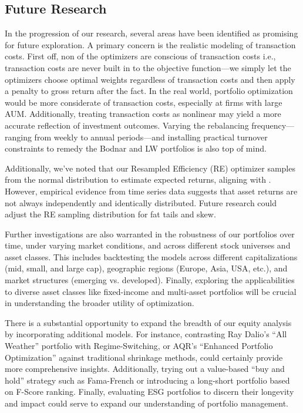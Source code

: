\documentclass[12pt,letterpaper]{article}
\begin{document}
\subsection{Future Research}
In the progression of our research, several areas have been identified as promising for future exploration. A primary concern is the realistic modeling of transaction costs. First off, non of the optimizers are conscious of transaction costs i.e., transaction costs are never built in to the objective function---we simply let the optimizers choose optimal weights regardless of transaction costs and then apply a penalty to gross return after the fact. In the real world, portfolio optimization would be more considerate of transaction costs, especially at firms with large AUM. Additionally, treating transaction costs as nonlinear may yield a more accurate reflection of investment outcomes. Varying the rebalancing frequency---ranging from weekly to annual periods---and installing practical turnover constraints to remedy the Bodnar and LW portfolios is also top of mind.

Additionally, we've noted that our Resampled Efficiency (RE) optimizer samples from the normal distribution to estimate expected returns, aligning with . However, empirical evidence from time series data suggests that asset returns are not always independently and identically distributed. Future research could adjust the RE sampling distribution for fat tails and skew.

Further investigations are also warranted in the robustness of our portfolios over time, under varying market conditions, and across different stock universes and asset classes. This includes backtesting the models across different capitalizations (mid, small, and large cap), geographic regions (Europe, Asia, USA, etc.), and market structures (emerging vs. developed). Finally, exploring the applicabilities to diverse asset classes like fixed-income and multi-asset portfolios will be crucial in understanding the broader utility of optimization.

There is a substantial opportunity to expand the breadth of our equity analysis by incorporating additional models. For instance, contrasting Ray Dalio's “All Weather” portfolio with Regime-Switching, or AQR's “Enhanced Portfolio Optimization” against traditional shrinkage methods, could certainly provide more comprehensive insights. Additionally, trying out a value-based “buy and hold” strategy such as Fama-French or introducing a long-short portfolio based on F-Score ranking. Finally, evaluating ESG portfolios to discern their longevity and impact could serve to expand our understanding of portfolio management.
\end{document}
